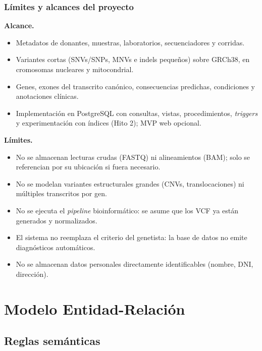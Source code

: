\documentclass[11pt,a4paper]{article}
\begin{document}
\subsubsection{Límites y alcances del proyecto}

\textbf{Alcance.}
\begin{itemize}
  \item Metadatos de donantes, muestras, laboratorios, secuenciadores y corridas.
  \item Variantes cortas (SNVs/SNPs, MNVs e indels pequeños) sobre GRCh38, en cromosomas nucleares y mitocondrial.
  \item Genes, exones del transcrito canónico, consecuencias predichas, condiciones y anotaciones clínicas.
  \item Implementación en PostgreSQL con consultas, vistas, procedimientos, \emph{triggers} y experimentación con índices (Hito 2); MVP web opcional.
\end{itemize}

\textbf{Límites.}
\begin{itemize}
  \item No se almacenan lecturas crudas (FASTQ) ni alineamientos (BAM); solo se referencian por su ubicación si fuera necesario.
  \item No se modelan variantes estructurales grandes (CNVs, translocaciones) ni múltiples transcritos por gen.
  \item No se ejecuta el \emph{pipeline} bioinformático: se asume que los VCF ya están generados y normalizados.
  \item El sistema no reemplaza el criterio del genetista: la base de datos no emite diagnósticos automáticos.
  \item No se almacenan datos personales directamente identificables (nombre, DNI, dirección).
\end{itemize}

\section{Modelo Entidad-Relación}

\subsection{Reglas semánticas}
\end{document}

